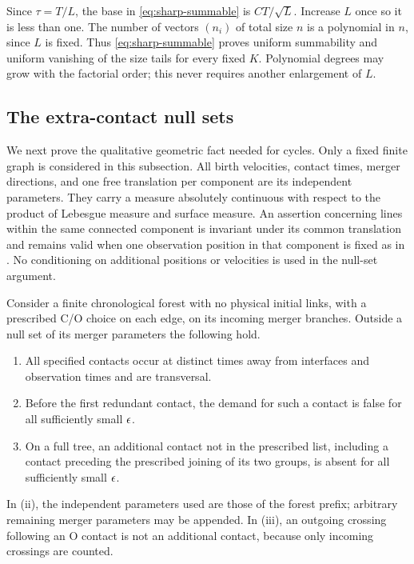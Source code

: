 Since \(\tau=T/L\), the base in \eqref{eq:sharp-summable} is
\(CT/\sqrt L\).  Increase \(L\) once so it is less than one.
The number of vectors \((n_i)\) of total size \(n\) is a polynomial
in \(n\), since \(L\) is fixed.  Thus
\eqref{eq:sharp-summable} proves uniform summability and uniform
vanishing of the size tails for every fixed \(K\).  Polynomial
degrees may grow with the factorial order; this never requires
another enlargement of \(L\).

\subsection{The extra-contact null sets}

We next prove the qualitative geometric fact needed for cycles.
Only a fixed finite graph is considered in this subsection.  All
birth velocities, contact times, merger directions, and one free
translation per component are its independent parameters.  They carry
a measure absolutely continuous with respect to the product of
Lebesgue measure and surface measure.  An assertion concerning lines
within the same connected component is invariant under its common
translation and remains valid when one observation position in that
component is fixed as in .  No conditioning
on additional positions or velocities is used in the null-set argument.

\begin{lemma}\label{lem:sharp-no-extra}
Consider a finite chronological forest with no physical initial
links, with a prescribed C/O choice on each edge, on its incoming
merger branches.  Outside a null set of its merger parameters the
following hold.
\begin{enumerate}[label=(\roman*)]
\item All specified contacts occur at distinct times away from
interfaces and observation times and are transversal.
\item Before the first redundant contact, the demand for such a
contact is false for all sufficiently small \(\epsilon\).
\item On a full tree, an additional contact not in the prescribed
list, including a contact preceding the prescribed joining of its
two groups, is absent for all sufficiently small \(\epsilon\).
\end{enumerate}
In (ii), the independent parameters used are those of the forest
prefix; arbitrary remaining merger parameters may be appended.
In (iii), an outgoing crossing following an O contact is not an
additional contact, because only incoming crossings are counted.
\end{lemma}

